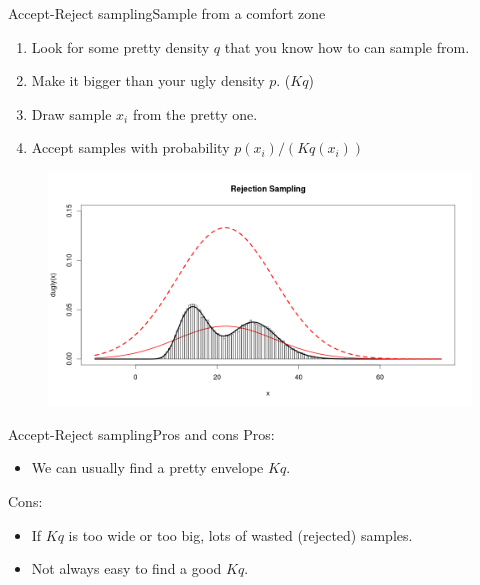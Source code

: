 \documentclass{beamer}
\begin{document}
\begin{frame}{Accept-Reject sampling}{Sample from a comfort zone}
	\begin{enumerate}
		\item Look for some pretty density $q$ that you know how to can sample from.
		\item Make it bigger than your ugly density $p$. ($Kq$)
		\item Draw sample $x_i$ from the pretty one.
		\item Accept samples with probability $p(x_i)/(Kq(x_i))$
	\end{enumerate}
		\begin{figure}
			\centering
			\includegraphics[width=\textwidth]{rejection.png}
		\end{figure}
\end{frame}

\begin{frame}{Accept-Reject sampling}{Pros and cons}
	Pros:
	\begin{itemize}
		\item We can usually find a pretty envelope $Kq$.
	\end{itemize}
	Cons:
	\begin{itemize}
		\item If $Kq$ is too wide or too big, lots of wasted (rejected) samples.
		\item Not always easy to find a good $Kq$.	\end{itemize}
\end{frame}
\end{document}
